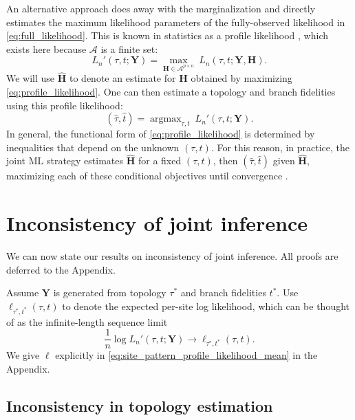 \documentclass{article}
\newcommand{\alphabet}{\mathcal{A}}
\newcommand{\fullAlignment}{\mathbf{Y}}
\newcommand{\fullAncestralStates}{\mathbf{H}}
\newcommand{\nCols}{n}
\newcommand{\nAncestralStateRows}{p}
\DeclareMathOperator*{\argmax}{argmax}
\begin{document}
An alternative approach \cite{Sagulenko2017-jo} does away with the marginalization and directly estimates the maximum likelihood parameters of the fully-observed likelihood in \eqref{eq:full_likelihood}.
This is known in statistics as a profile likelihood \cite{Murphy2000-ry}, which exists here because $\alphabet$ is a finite set:
\begin{equation}
\label{eq:profile_likelihood}
L_\nCols'(\tau, t; \fullAlignment) = \max_{\fullAncestralStates\in\alphabet^{\nAncestralStateRows\times\nCols}} \ L_\nCols(\tau, t; \fullAlignment, \fullAncestralStates).
\end{equation}
We will use $\hat{\fullAncestralStates}$ to denote an estimate for $\fullAncestralStates$ obtained by maximizing \eqref{eq:profile_likelihood}.
One can then estimate a topology and branch fidelities using this profile likelihood:
\begin{equation}
\label{eq:profile_likelihood_topology_bl}
(\hat{\tau}, \hat{t}) = \argmax_{\tau, t} \ L_\nCols'(\tau, t; \fullAlignment).
\end{equation}
In general, the functional form of \eqref{eq:profile_likelihood} is determined by inequalities that depend on the unknown $(\tau,t)$.
For this reason, in practice, the joint ML strategy estimates $\hat{\fullAncestralStates}$ for a fixed $(\tau,t)$, then $(\hat{\tau},\hat{t})$ given $\hat{\fullAncestralStates}$, maximizing each of these conditional objectives until convergence \cite{Sagulenko2017-jo}.


\section*{Inconsistency of joint inference}

We can now state our results on inconsistency of joint inference.
All proofs are deferred to the Appendix.

Assume $\fullAlignment$ is generated from topology $\tau^*$ and branch fidelities $t^*$.
Use $\ell_{\tau^*,t^*}(\tau, t)$ to denote the expected per-site log likelihood, which can be thought of as the infinite-length sequence limit
$$
\frac{1}{n}\log L_\nCols'(\tau, t; \fullAlignment) \rightarrow \ell_{\tau^*,t^*}(\tau, t).
$$
We give $\ell$ explicitly in \eqref{eq:site_pattern_profile_likelihood_mean} in the Appendix.

\subsection*{Inconsistency in topology estimation}
\end{document}
